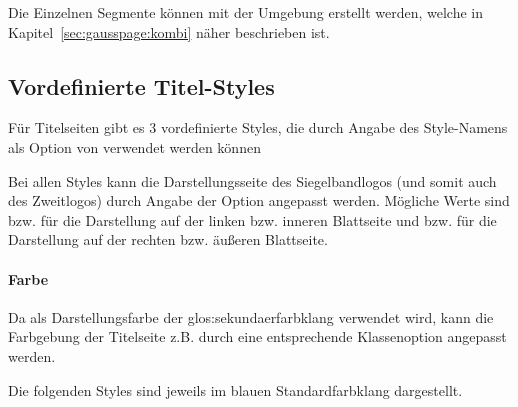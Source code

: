 Die Einzelnen Segmente können mit der Umgebung 
erstellt werden, welche in Kapitel~\ref{sec:gausspage:kombi} näher beschrieben ist.

\subsection{Vordefinierte Titel-Styles}\label{sec:titlestyles}


Für Titelseiten gibt es 3 vordefinierte Styles, die durch Angabe des
Style-Namens als Option von  verwendet werden können

\begin{Declaration}
\end{Declaration}

Bei allen Styles kann die Darstellungsseite des Siegelbandlogos
(und somit auch des Zweitlogos) durch Angabe der Option
 angepasst werden.
Mögliche Werte sind  bzw.  für die Darstellung
auf der linken bzw. inneren Blattseite und  bzw. 
für die Darstellung auf der rechten bzw. äußeren Blattseite.

\paragraph{Farbe}
Da als Darstellungsfarbe der \gls{glos:sekundaerfarbklang} verwendet wird,
kann die Farbgebung der Titelseite z.B. durch eine entsprechende Klassenoption
angepasst werden.

Die folgenden Styles sind jeweils im blauen Standardfarbklang dargestellt.


